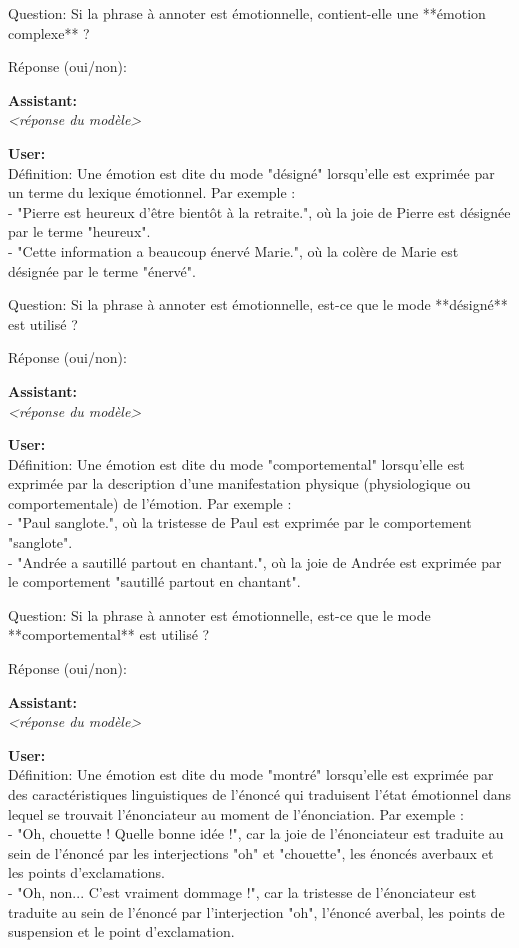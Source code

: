 {Question: Si la phrase à annoter est émotionnelle, contient-elle une **émotion complexe** ?

Réponse (oui/non):

\textbf{Assistant:}\\
\textit{<réponse du modèle>}

\textbf{User:}\\
Définition: Une émotion est dite du mode "désigné" lorsqu'elle est exprimée par un terme du lexique émotionnel. Par exemple :\\
- "Pierre est heureux d'être bientôt à la retraite.", où la joie de Pierre est désignée par le terme "heureux".\\
- "Cette information a beaucoup énervé Marie.", où la colère de Marie est désignée par le terme "énervé".

Question: Si la phrase à annoter est émotionnelle, est-ce que le mode **désigné** est utilisé ?

Réponse (oui/non):

\textbf{Assistant:}\\
\textit{<réponse du modèle>}

\textbf{User:}\\
Définition: Une émotion est dite du mode "comportemental" lorsqu'elle est exprimée par la description d'une manifestation physique (physiologique ou comportementale) de l'émotion. Par exemple :\\
- "Paul sanglote.", où la tristesse de Paul est exprimée par le comportement "sanglote".\\
- "Andrée a sautillé partout en chantant.", où la joie de Andrée est exprimée par le comportement "sautillé partout en chantant".

Question: Si la phrase à annoter est émotionnelle, est-ce que le mode **comportemental** est utilisé ?

Réponse (oui/non):

\textbf{Assistant:}\\
\textit{<réponse du modèle>}

\textbf{User:}\\
Définition: Une émotion est dite du mode "montré" lorsqu'elle est exprimée par des caractéristiques linguistiques de l'énoncé qui traduisent l'état émotionnel dans lequel se trouvait l'énonciateur au moment de l'énonciation. Par exemple :\\
- "Oh, chouette ! Quelle bonne idée !", car la joie de l'énonciateur est traduite au sein de l'énoncé par les interjections "oh" et "chouette", les énoncés averbaux et les points d'exclamations.\\
- "Oh, non... C'est vraiment dommage !", car la tristesse de l'énonciateur est traduite au sein de l'énoncé par l'interjection "oh", l'énoncé averbal, les points de suspension et le point d'exclamation.

}
